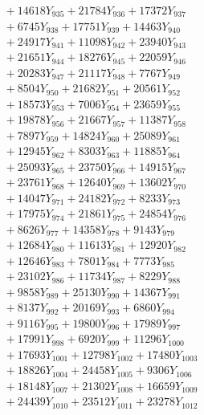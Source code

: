 \documentclass[a4paper,10pt]{article}
\begin{document}
{\begin{align}
&\;  + 14618 Y_{935} + 21784 Y_{936} + 17372 Y_{937} \\[0.3ex]
&\;  + 6745 Y_{938} + 17751 Y_{939} + 14463 Y_{940} \\[0.3ex]
&\;  + 24917 Y_{941} + 11098 Y_{942} + 23940 Y_{943} \\[0.3ex]
&\;  + 21651 Y_{944} + 18276 Y_{945} + 22059 Y_{946} \\[0.3ex]
&\;  + 20283 Y_{947} + 21117 Y_{948} + 7767 Y_{949} \\[0.3ex]
&\;  + 8504 Y_{950} + 21682 Y_{951} + 20561 Y_{952} \\[0.3ex]
&\;  + 18573 Y_{953} + 7006 Y_{954} + 23659 Y_{955} \\[0.3ex]
&\;  + 19878 Y_{956} + 21667 Y_{957} + 11387 Y_{958} \\[0.5ex]\allowbreak
&\;  + 7897 Y_{959} + 14824 Y_{960} + 25089 Y_{961} \\[0.3ex]
&\;  + 12945 Y_{962} + 8303 Y_{963} + 11885 Y_{964} \\[0.3ex]
&\;  + 25093 Y_{965} + 23750 Y_{966} + 14915 Y_{967} \\[0.3ex]
&\;  + 23761 Y_{968} + 12640 Y_{969} + 13602 Y_{970} \\[0.3ex]
&\;  + 14047 Y_{971} + 24182 Y_{972} + 8233 Y_{973} \\[0.3ex]
&\;  + 17975 Y_{974} + 21861 Y_{975} + 24854 Y_{976} \\[0.3ex]
&\;  + 8626 Y_{977} + 14358 Y_{978} + 9143 Y_{979} \\[0.3ex]
&\;  + 12684 Y_{980} + 11613 Y_{981} + 12920 Y_{982} \\[0.3ex]
&\;  + 12646 Y_{983} + 7801 Y_{984} + 7773 Y_{985} \\[0.3ex]
&\;  + 23102 Y_{986} + 11734 Y_{987} + 8229 Y_{988} \\[0.5ex]\allowbreak
&\;  + 9858 Y_{989} + 25130 Y_{990} + 14367 Y_{991} \\[0.3ex]
&\;  + 8137 Y_{992} + 20169 Y_{993} + 6860 Y_{994} \\[0.3ex]
&\;  + 9116 Y_{995} + 19800 Y_{996} + 17989 Y_{997} \\[0.3ex]
&\;  + 17991 Y_{998} + 6920 Y_{999} + 11296 Y_{1000} \\[0.3ex]
&\;  + 17693 Y_{1001} + 12798 Y_{1002} + 17480 Y_{1003} \\[0.3ex]
&\;  + 18826 Y_{1004} + 24458 Y_{1005} + 9306 Y_{1006} \\[0.3ex]
&\;  + 18148 Y_{1007} + 21302 Y_{1008} + 16659 Y_{1009} \\[0.3ex]
&\;  + 24439 Y_{1010} + 23512 Y_{1011} + 23278 Y_{1012} \\[0.3ex]

\end{align}}
\end{document}
